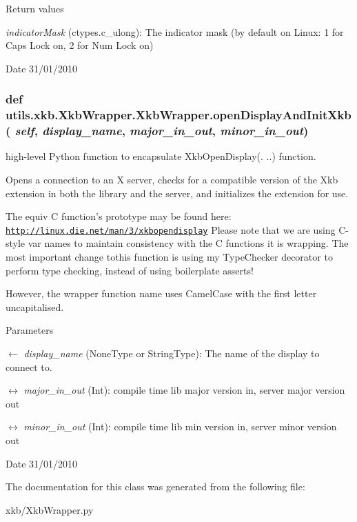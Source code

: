 \begin{DoxyRetVals}{Return values}
\item[{\em indicatorMask}](ctypes.c\_\-ulong): The indicator mask (by default on Linux: 1 for Caps Lock on, 2 for Num Lock on) \end{DoxyRetVals}
\begin{DoxyDate}{Date}
31/01/2010 
\end{DoxyDate}
\hypertarget{classutils_1_1xkb_1_1XkbWrapper_1_1XkbWrapper_af3951614a2c9e25d60d8e0c7f94c6866}{
\subsubsection[{openDisplayAndInitXkb}]{\setlength{\rightskip}{0pt plus 5cm}def utils.xkb.XkbWrapper.XkbWrapper.openDisplayAndInitXkb ( {\em self}, \/   {\em display\_\-name}, \/   {\em major\_\-in\_\-out}, \/   {\em minor\_\-in\_\-out})}}
\label{classutils_1_1xkb_1_1XkbWrapper_1_1XkbWrapper_af3951614a2c9e25d60d8e0c7f94c6866}


high-\/level Python function to encapsulate XkbOpenDisplay(. ..) function.

Opens a connection to an X server, checks for a compatible version of the Xkb extension in both the library and the server, and initializes the extension for use.

The equiv C function's prototype may be found here: \href{http://linux.die.net/man/3/xkbopendisplay}{\tt http://linux.die.net/man/3/xkbopendisplay} Please note that we are using C-\/style var names to maintain consistency with the C functions it is wrapping. The most important change tothis function is using my TypeChecker decorator to perform type checking, instead of using boilerplate asserts!

However, the wrapper function name uses CamelCase with the first letter uncapitalised.


\begin{DoxyParams}{Parameters}
\item[\mbox{$\leftarrow$} {\em display\_\-name}](NoneType or StringType): The name of the display to connect to. \item[\mbox{$\leftrightarrow$} {\em major\_\-in\_\-out}](Int): compile time lib major version in, server major version out \item[\mbox{$\leftrightarrow$} {\em minor\_\-in\_\-out}](Int): compile time lib min version in, server minor version out \end{DoxyParams}
\begin{DoxyDate}{Date}
31/01/2010 
\end{DoxyDate}


The documentation for this class was generated from the following file:\begin{DoxyCompactItemize}
\item 
xkb/XkbWrapper.py\end{DoxyCompactItemize}
